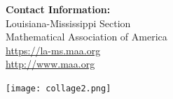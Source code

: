 \documentclass[10pt]{article} %
\begin{document}




\vfill
\hfill%
  \begin{minipage}[t]{.32\linewidth}
    \textbf{Contact Information:}\\
    Louisiana-Mississippi Section\\
    Mathematical Association of America\\
    \href{https://la-ms.maa.org}{https://la-ms.maa.org}\\
    \href{http://www.maa.org}{http://www.maa.org}\\
  \end{minipage}



\begin{minipage}{\linewidth}
  \begin{center}
      \texttt{[image: collage2.png]}%
  \end{center}%
  \vfill
\end{minipage}
\end{document}
